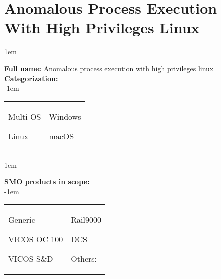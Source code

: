 
%
%

\section{Anomalous Process Execution With High Privileges Linux}
\label{15662}

\openup 1em

\textbf{Full name:} Anomalous process execution with high privileges linux\hrulefill \\
{\bf Categorization:} \\

\openup -1em
\vspace{-3em}

\begin{tabular}{p{}p{}}

\begin{todolist}
  	\item Multi-OS
	\item[\done] Linux
\end{todolist}
&
\begin{todolist}
	\item Windows
	\item macOS
\end{todolist}

\end{tabular}

\openup 1em

{\bf SMO products in scope:} \\

\openup -1em
\vspace{-3em}

\begin{tabular}{p{}p{}}

\begin{todolist}
  \item[\done] Generic
  \item VICOS OC 100
  \item VICOS S\&D
\end{todolist}
&
\begin{todolist}
  \item[\done] Rail9000
  \item DCS
  \item Others: \hrulefill
\end{todolist}

\end{tabular}

